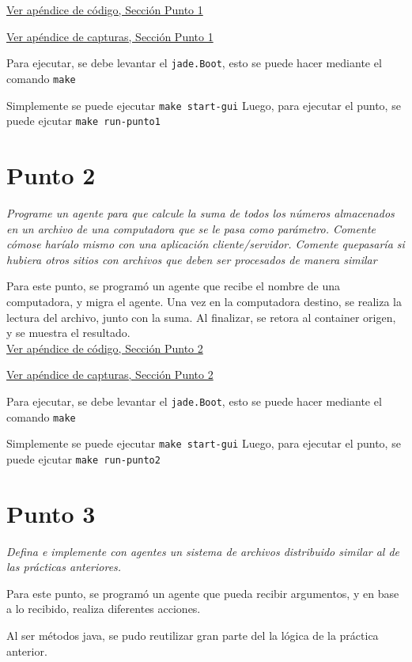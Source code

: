 \documentclass[12pt,journal,compsoc]{IEEEtran}
\begin{document}
\hyperref[section:code-punto1]{Ver apéndice de código, Sección Punto 1}

\hyperref[section:cap-punto1]{Ver apéndice de capturas, Sección Punto 1}

Para ejecutar, se debe levantar el \texttt{jade.Boot}, esto se puede hacer
mediante el comando \texttt{make}

Simplemente se puede ejecutar \texttt{make start-gui}
Luego, para ejecutar el punto, se puede ejcutar \texttt{make run-punto1}

\section{Punto 2}

\textit{Programe un agente para que calcule la suma de todos los números
almacenados en un archivo de una computadora que se le pasa como
parámetro. Comente cómose haríalo mismo con una aplicación
cliente/servidor. Comente quepasaría si hubiera otros sitios con
archivos que deben ser procesados de manera similar}

Para este punto, se programó un agente que recibe el nombre de una computadora,
y migra el agente.
Una vez en la computadora destino, se realiza la lectura del archivo,
junto con la suma.
Al finalizar, se retora al container origen, y se muestra el resultado.\\

\hyperref[section:code-punto2]{Ver apéndice de código, Sección Punto 2}

\hyperref[section:cap-punto2]{Ver apéndice de capturas, Sección Punto 2}

Para ejecutar, se debe levantar el \texttt{jade.Boot}, esto se puede hacer
mediante el comando \texttt{make}

Simplemente se puede ejecutar \texttt{make start-gui}
Luego, para ejecutar el punto, se puede ejcutar \texttt{make run-punto2}


\section{Punto 3}

\textit{Defina  e  implemente  con  agentes  un  sistema  de  archivos
distribuido  similar  al  de  las prácticas anteriores.}

Para este punto, se programó un agente que pueda recibir argumentos, y
en base a lo recibido, realiza diferentes acciones.

Al ser métodos java, se pudo reutilizar gran parte del la lógica de la
práctica anterior.
\end{document}
